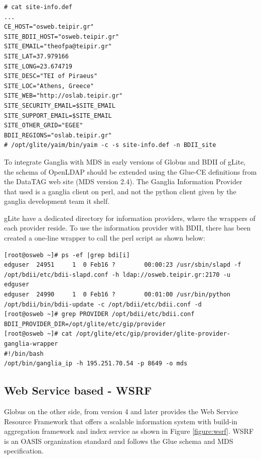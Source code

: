 \begin{lstlisting}
# cat site-info.def
...
CE_HOST="osweb.teipir.gr"
SITE_BDII_HOST="osweb.teipir.gr"
SITE_EMAIL="theofpa@teipir.gr"
SITE_LAT=37.979166
SITE_LONG=23.674719
SITE_DESC="TEI of Piraeus"
SITE_LOC="Athens, Greece"
SITE_WEB="http://oslab.teipir.gr"
SITE_SECURITY_EMAIL=$SITE_EMAIL
SITE_SUPPORT_EMAIL=$SITE_EMAIL
SITE_OTHER_GRID="EGEE"
BDII_REGIONS="oslab.teipir.gr"
# /opt/glite/yaim/bin/yaim -c -s site-info.def -n BDII_site
\end{lstlisting}

To integrate Ganglia with MDS in early versions of Globus and BDII of gLite, the schema of OpenLDAP should be extended using the Glue-CE definitions from the DataTAG web site (MDS version 2.4). The Ganglia Information Provider that used is a ganglia client on perl, and not the python client given by the ganglia development team it shelf.

gLite have a dedicated directory for information providers, where the wrappers of each provider reside. To use the information provider with BDII, there has been created a one-line wrapper to call the perl script as shown below:

\begin{lstlisting}
[root@osweb ~]# ps -ef |grep bdi[i]
edguser  24951     1  0 Feb16 ?        00:00:23 /usr/sbin/slapd -f /opt/bdii/etc/bdii-slapd.conf -h ldap://osweb.teipir.gr:2170 -u edguser
edguser  24990     1  0 Feb16 ?        00:01:00 /usr/bin/python /opt/bdii/bin/bdii-update -c /opt/bdii/etc/bdii.conf -d
[root@osweb ~]# grep PROVIDER /opt/bdii/etc/bdii.conf
BDII_PROVIDER_DIR=/opt/glite/etc/gip/provider
[root@osweb ~]# cat /opt/glite/etc/gip/provider/glite-provider-ganglia-wrapper
#!/bin/bash
/opt/bin/ganglia_ip -h 195.251.70.54 -p 8649 -o mds
\end{lstlisting}

\subsection{Web Service based - WSRF}

Globus on the other side, from version 4 and later provides the Web Service Resource Framework that offers a scalable information system with build-in aggregation framework and index service as shown in Figure \ref{figure:wsrf}. WSRF is an OASIS organization standard and follows the Glue schema and MDS specification.


